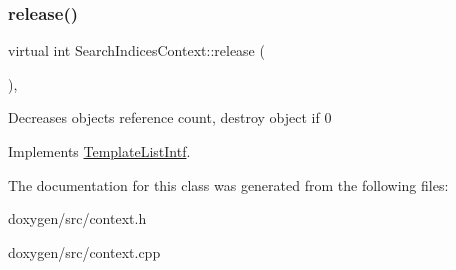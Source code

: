 \mbox{\label{class_search_indices_context_aaa6a25a82368e6d94c4c552687f2af7b}} 
\subsubsection{\texorpdfstring{release()}{release()}}
{\footnotesize\ttfamily virtual int Search\+Indices\+Context\+::release (\begin{DoxyParamCaption}{ }\end{DoxyParamCaption})\hspace{0.3cm}{\ttfamily [inline]}, {\ttfamily [virtual]}}

Decreases object\textquotesingle{}s reference count, destroy object if 0 

Implements \mbox{\hyperlink{class_template_list_intf_a0c53169c740c09dac47efc62bbe39674}{Template\+List\+Intf}}.



The documentation for this class was generated from the following files\+:\begin{DoxyCompactItemize}
\item 
doxygen/src/context.\+h\item 
doxygen/src/context.\+cpp\end{DoxyCompactItemize}
